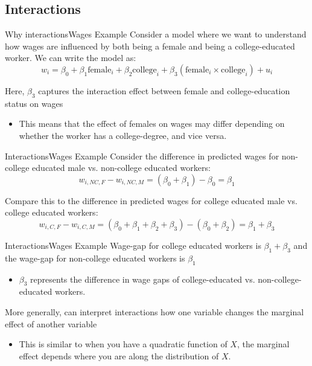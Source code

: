 \documentclass[aspectratio=169,t,11pt,table]{beamer}
\begin{document}
\subsection{Interactions}

\begin{frame}{Why interactions}{Wages Example}
  Consider a model where we want to understand how wages are influenced by both being a female and being a college-educated worker. We can write the model as:
  $$
    w_i = \beta_0 + \beta_1 \text{female}_i + \beta_2 \text{college}_i + \beta_3 (\text{female}_i \times \text{college}_i) + u_i
  $$
  
  \bigskip
  Here, $\beta_3$ captures the interaction effect between female and college-education status on wages
  \begin{itemize}
    \item This means that the effect of females on wages may differ depending on whether the worker has a college-degree, and vice versa.
  \end{itemize}
\end{frame}

\begin{frame}{Interactions}{Wages Example}
  Consider the difference in predicted wages for non-college educated male vs. non-college educated workers:
  $$
    w_{i, NC,F} - w_{i, NC,M} = (\beta_0 + \beta_1) - \beta_0 = \beta_1
  $$

  \bigskip
  Compare this to the difference in predicted wages for college educated male vs. college educated workers:
  $$
    w_{i, C,F} - w_{i, C,M} = (\beta_0 + \beta_1 + \beta_2 + \beta_3) - (\beta_0 + \beta_2) = \beta_1 + \beta_3
  $$
\end{frame}

\begin{frame}{Interactions}{Wages Example}
  Wage-gap for college educated workers is $\beta_1 + \beta_3$ and the wage-gap for non-college educated workers is $\beta_1$
  \begin{itemize}
    \item $\beta_3$ represents the difference in wage gaps of college-educated vs. non-college-educated workers.
  \end{itemize}

  \pause
  \bigskip
  More generally, can interpret interactions how one variable changes the marginal effect of another variable
  \begin{itemize}
    \item This is similar to when you have a quadratic function of $X$, the marginal effect depends where you are along the distribution of $X$.
  \end{itemize}
\end{frame}
\end{document}
